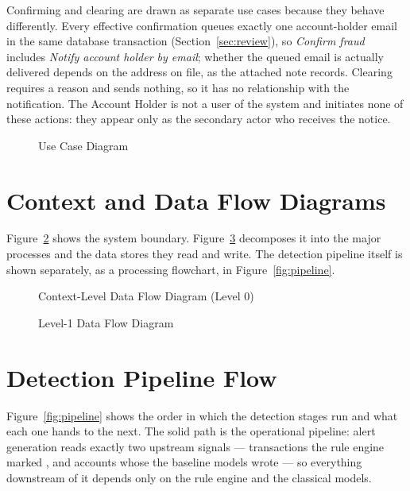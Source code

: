 Confirming and clearing are drawn as separate use cases because they behave differently. Every effective confirmation queues exactly one account-holder email in the same database transaction (Section~\ref{sec:review}), so \textit{Confirm fraud} \guillemotleft include\guillemotright s \textit{Notify account holder by email}; whether the queued email is actually delivered depends on the address on file, as the attached note records. Clearing requires a reason and sends nothing, so it has no relationship with the notification. The Account Holder is not a user of the system and initiates none of these actions: they appear only as the secondary actor who receives the notice.

\begin{figure}[htbp]
\centering
{}
\caption{Use Case Diagram}
\label{fig:usecase}
\end{figure}

\section{Context and Data Flow Diagrams}
Figure~\ref{fig:dfd0} shows the system boundary. Figure~\ref{fig:dfd1} decomposes it into the major processes and the data stores they read and write. The detection pipeline itself is shown separately, as a processing flowchart, in Figure~\ref{fig:pipeline}.

\begin{figure}[htbp]
\centering
{}
\caption{Context-Level Data Flow Diagram (Level 0)}
\label{fig:dfd0}
\end{figure}

\begin{figure}[htbp]
\centering
{}
\caption{Level-1 Data Flow Diagram}
\label{fig:dfd1}
\end{figure}

\section{Detection Pipeline Flow}
Figure~\ref{fig:pipeline} shows the order in which the detection stages run and what each one hands to the next. The solid path is the operational pipeline: alert generation reads exactly two upstream signals --- transactions the rule engine marked , and accounts whose  the baseline models wrote --- so everything downstream of it depends only on the rule engine and the classical models.

